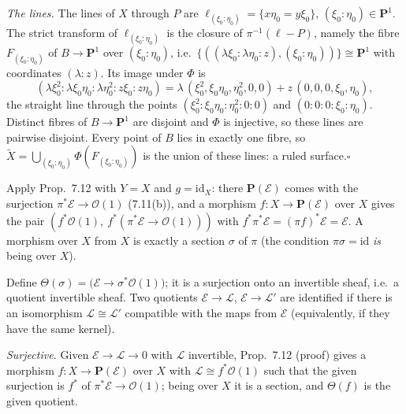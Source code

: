 \documentclass[11pt]{article}
\begin{document}
\emph{The lines.} The lines of $X$ through $P$ are $\ell_{(\xi_0:\eta_0)}=\{x\eta_0=y\xi_0\}$, $(\xi_0:\eta_0)\in\mathbf P^1$. The strict transform of $\ell_{(\xi_0:\eta_0)}$ is the closure of $\pi^{-1}(\ell-P)$, namely the fibre $F_{(\xi_0:\eta_0)}$ of $B\to\mathbf P^1$ over $(\xi_0:\eta_0)$, i.e.\ $\{((\lambda\xi_0:\lambda\eta_0:z),(\xi_0:\eta_0))\}\cong\mathbf P^1$ with coordinates $(\lambda:z)$. Its image under $\Phi$ is
\[
(\lambda\xi_0^2:\lambda\xi_0\eta_0:\lambda\eta_0^2:z\xi_0:z\eta_0)=\lambda\,(\xi_0^2,\xi_0\eta_0,\eta_0^2,0,0)+z\,(0,0,0,\xi_0,\eta_0),
\]
the straight line through the points $(\xi_0^2:\xi_0\eta_0:\eta_0^2:0:0)$ and $(0:0:0:\xi_0:\eta_0)$. Distinct fibres of $B\to\mathbf P^1$ are disjoint and $\Phi$ is injective, so these lines are pairwise disjoint. Every point of $B$ lies in exactly one fibre, so $\tilde X=\bigcup_{(\xi_0:\eta_0)}\Phi(F_{(\xi_0:\eta_0)})$ is the union of these lines: a ruled surface.\hfill$\square$

\pf
Apply Prop.~7.12 with $Y=X$ and $g=\mathrm{id}_X$: there $\mathbf P(\mathcal E)$ comes with the surjection $\pi^*\mathcal E\to\mathcal O(1)$ (7.11(b)), and a morphism $f:X\to\mathbf P(\mathcal E)$ over $X$ gives the pair $(f^*\mathcal O(1),\ f^*(\pi^*\mathcal E\to\mathcal O(1)))$ with $f^*\pi^*\mathcal E=(\pi f)^*\mathcal E=\mathcal E$. A morphism over $X$ from $X$ is exactly a section $\sigma$ of $\pi$ (the condition $\pi\sigma=\mathrm{id}$ \emph{is} being over $X$).

Define $\Theta(\sigma)=\bigl(\mathcal E\to\sigma^*\mathcal O(1)\bigr)$; it is a surjection onto an invertible sheaf, i.e.\ a quotient invertible sheaf. Two quotients $\mathcal E\to\mathcal L$, $\mathcal E\to\mathcal L'$ are identified if there is an isomorphism $\mathcal L\cong\mathcal L'$ compatible with the maps from $\mathcal E$ (equivalently, if they have the same kernel).

\emph{Surjective.} Given $\mathcal E\to\mathcal L\to0$ with $\mathcal L$ invertible, Prop.~7.12 (proof) gives a morphism $f:X\to\mathbf P(\mathcal E)$ over $X$ with $\mathcal L\cong f^*\mathcal O(1)$ such that the given surjection is $f^*$ of $\pi^*\mathcal E\to\mathcal O(1)$; being over $X$ it is a section, and $\Theta(f)$ is the given quotient.
\end{document}
